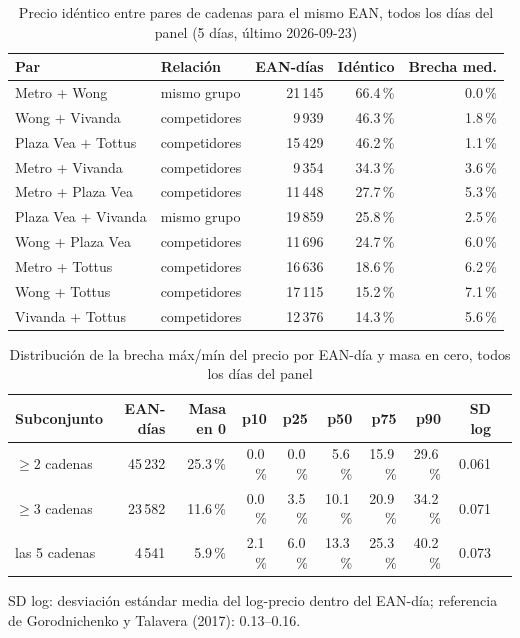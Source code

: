 
\begin{table}[htbp]
\caption{Precio id\'entico entre pares de cadenas para el mismo EAN, todos los d\'ias del panel (5 d\'ias, \'ultimo 2026-09-23)}
\label{tab:identidad}
\centering\scriptsize\setlength{\tabcolsep}{3pt}
\begin{tabular}{@{}llrrr@{}}
\toprule
Par & Relaci\'on & EAN-d\'ias & Id\'entico & Brecha med. \\
\midrule
Metro + Wong & mismo grupo & 21\,145 & 66.4\,\% & 0.0\,\% \\
Wong + Vivanda & competidores & 9\,939 & 46.3\,\% & 1.8\,\% \\
Plaza Vea + Tottus & competidores & 15\,429 & 46.2\,\% & 1.1\,\% \\
Metro + Vivanda & competidores & 9\,354 & 34.3\,\% & 3.6\,\% \\
Metro + Plaza Vea & competidores & 11\,448 & 27.7\,\% & 5.3\,\% \\
Plaza Vea + Vivanda & mismo grupo & 19\,859 & 25.8\,\% & 2.5\,\% \\
Wong + Plaza Vea & competidores & 11\,696 & 24.7\,\% & 6.0\,\% \\
Metro + Tottus & competidores & 16\,636 & 18.6\,\% & 6.2\,\% \\
Wong + Tottus & competidores & 17\,115 & 15.2\,\% & 7.1\,\% \\
Vivanda + Tottus & competidores & 12\,376 & 14.3\,\% & 5.6\,\% \\
\bottomrule\end{tabular}\end{table}

\begin{table}[t]
\caption{Distribuci\'on de la brecha m\'ax/m\'in del precio por EAN-d\'ia y masa en cero, todos los d\'ias del panel}
\label{tab:brecha}
\centering\scriptsize\setlength{\tabcolsep}{4pt}
\begin{tabular}{@{}lrrrrrrrrr@{}}
\toprule
Subconjunto & EAN-d\'ias & Masa en 0 & p10 & p25 & p50 & p75 & p90 & SD log \\
\midrule
$\geq 2$ cadenas & 45\,232 & 25.3\,\% & 0.0\,\% & 0.0\,\% & 5.6\,\% & 15.9\,\% & 29.6\,\% & 0.061 \\
$\geq 3$ cadenas & 23\,582 & 11.6\,\% & 0.0\,\% & 3.5\,\% & 10.1\,\% & 20.9\,\% & 34.2\,\% & 0.071 \\
las 5 cadenas & 4\,541 & 5.9\,\% & 2.1\,\% & 6.0\,\% & 13.3\,\% & 25.3\,\% & 40.2\,\% & 0.073 \\
\bottomrule\end{tabular}
\par\smallskip\raggedright\scriptsize SD log: desviaci\'on est\'andar media del log-precio dentro del EAN-d\'ia; referencia de Gorodnichenko y Talavera (2017): 0.13--0.16.
\end{table}

